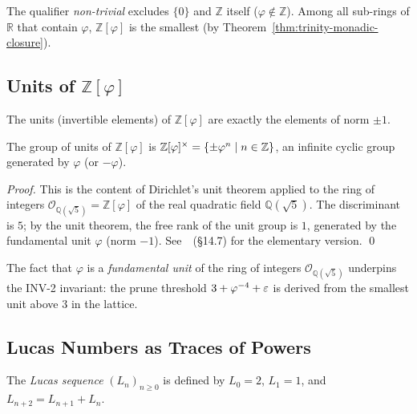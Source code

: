 \begin{remark}\label{rem:non-trivial}
  The qualifier \emph{non-trivial} excludes $\{0\}$ and $\mathbb{Z}$
  itself ($\varphi \notin \mathbb{Z}$).  Among all sub-rings of $\mathbb{R}$
  that contain $\varphi$, $\mathbb{Z}[\varphi]$ is the smallest
  (by Theorem~\ref{thm:trinity-monadic-closure}).
\end{remark}

\subsection{Units of $\mathbb{Z}[\varphi]$}

The units (invertible elements) of $\mathbb{Z}[\varphi]$ are exactly
the elements of norm $\pm 1$.

\begin{proposition}\label{prop:units}
  The group of units of $\mathbb{Z}[\varphi]$ is
  $\mathbb{Z}[\varphi]^{\times} = \{\pm\varphi^{n} \mid n \in \mathbb{Z}\}$,
  an infinite cyclic group generated by $\varphi$ (or $-\varphi$).
\end{proposition}

\begin{proof}
  This is the content of Dirichlet's unit theorem applied to the
  ring of integers $\mathcal{O}_{\mathbb{Q}(\sqrt{5})} = \mathbb{Z}[\varphi]$
  of the real quadratic field $\mathbb{Q}(\sqrt{5})$.  The discriminant
  is $5$; by the unit theorem, the free rank of the unit group is $1$,
  generated by the fundamental unit $\varphi$ (norm $-1$).
  See~\cite{hardywright}~(§14.7) for the elementary version.  \qed
\end{proof}

The fact that $\varphi$ is a \emph{fundamental unit} of the ring of
integers $\mathcal{O}_{\mathbb{Q}(\sqrt{5})}$ underpins the INV-2
invariant: the prune threshold $3 + \varphi^{-4} + \varepsilon$ is
derived from the smallest unit above $3$ in the lattice.

\subsection{Lucas Numbers as Traces of Powers}

\begin{definition}\label{def:lucas-sequence}
  The \emph{Lucas sequence} $(L_n)_{n \geq 0}$ is defined by
  $L_0 = 2$, $L_1 = 1$, and $L_{n+2} = L_{n+1} + L_n$.
\end{definition}

